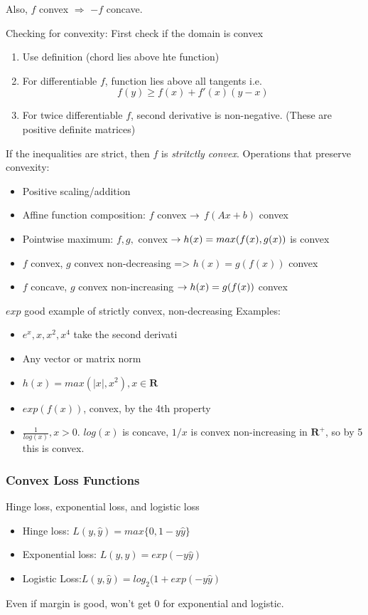Also, $f$ convex $\Rightarrow$ $-f$ concave.

Checking for convexity: First check if the domain is convex
\begin{enumerate}
\item Use definition (chord lies above hte function)
\item For differentiable $f$, function lies above all tangents i.e.
$$f(y) \ge f(x) + f'(x)(y-x)$$
\item For twice differentiable $f$, second derivative is
  non-negative. (These are positive definite matrices)
\end{enumerate}
If the inequalities are strict, then $f$ is \emph{stritctly convex}.
Operations that preserve convexity:
\begin{itemize}
\item Positive scaling/addition
\item Affine function composition: $f$ convex $\rightarrow$ $f(Ax+b)$ convex
\item Pointwise maximum: $f,g,$ convex $\rightarrow h(x) = max(f(x),g(x))$
  is convex
\item $f$ convex, $g$ convex non-decreasing => $h(x)=g(f(x))$ convex
\item $f$ concave, $g$ convex non-increasing $\rightarrow h(x) =g(f(x))$ convex

\end{itemize}
$exp$ good example of strictly convex, non-decreasing
Examples:
\begin{itemize}
\item $e^x,x,x^2,x^4$ take the second derivati
\item Any vector or matrix norm
\item $h(x) = max(|x|,x^2), x\in \mathbf{R}$
\item $exp(f(x))$, convex, by the 4th property
\item $\frac{1}{log(x)}, x>0$. $log(x)$ is concave, $1/x$
  is convex non-increasing in $\mathbf{R^+}$, so by 5 this is convex.
\end{itemize}

\subsubsection{Convex Loss Functions}
\label{sec:convexlossfunctions}

Hinge loss, exponential loss, and logistic loss
\begin{itemize}
\item Hinge loss: $L(y,\hat y) = max\{0, 1-y\hat y\}$
\item Exponential loss: $L(y,\hat y) = exp(-y\hat y)$ 
\item Logistic Loss:$L(y,\hat y) = log_2(1+exp(-y\hat y)$ 
\end{itemize}
Even if margin  is good, won't get 0 for exponential and logistic.

